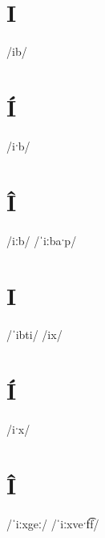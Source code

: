 \documentclass[10pt,a4paper,twoside]{book}
\begin{document}
\section*{I}

\begin{multicols}{3}
 {/ib/} {}
\end{multicols}

\section*{Í}

\begin{multicols}{3}
 {/iˑb/} {}
\end{multicols}

\section*{Î}

\begin{multicols}{3}
 {/iːb/} {}
 {/ˈiːbaˑp/} {}
\end{multicols}

\section*{I}

\begin{multicols}{3}
 {/ˈibti/} {}
 {/ix/} {}
\end{multicols}

\section*{Í}

\begin{multicols}{3}
 {/iˑx/} {}
\end{multicols}

\section*{Î}

\begin{multicols}{3}
 {/ˈiːxgeː/} {}
 {/ˈiːxveˑf͡f/} {}
\end{multicols}
\end{document}
